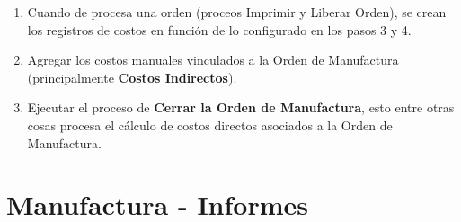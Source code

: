 \documentclass[letterpaper,10pt,spanish]{sphinxmanual}
\begin{document}
\begin{enumerate}
\item {} 
Cuando de procesa una orden (proceos Imprimir y Liberar Orden), se crean los registros de costos en función de lo configurado en los pasos 3 y 4.

\item {} 
Agregar los costos manuales vinculados a la Orden de Manufactura (principalmente \textbf{Costos Indirectos}).

\item {} 
Ejecutar el proceso de \textbf{Cerrar la Orden de Manufactura}, esto entre otras cosas procesa el cálculo de costos directos asociados a la Orden de Manufactura.

\end{enumerate}


\section{Manufactura - Informes}
\label{manufactura-informes::doc}\label{manufactura-informes:manufactura-informes}


\renewcommand{\indexname}{Índice}
\printindex
\end{document}
